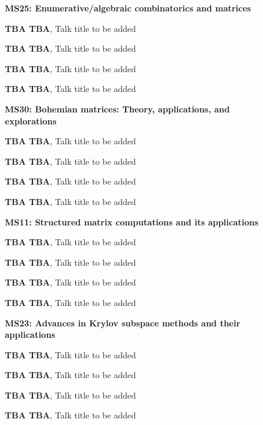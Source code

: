 \documentclass[ILAS2025-program.tex]{subfiles}
\begin{document}
\begin{description}
    \begin{description}
    \item[] \textbf{MS25: Enumerative/algebraic combinatorics and matrices} 
    \item[] \textbf{TBA TBA}, Talk title to be added
        \item[] \textbf{TBA TBA}, Talk title to be added
        \item[] \textbf{TBA TBA}, Talk title to be added
        \item[] \textbf{TBA TBA}, Talk title to be added
        \end{description}
    \begin{description}
    \item[] \textbf{MS30: Bohemian matrices: Theory, applications, and explorations} 
    \item[] \textbf{TBA TBA}, Talk title to be added
        \item[] \textbf{TBA TBA}, Talk title to be added
        \item[] \textbf{TBA TBA}, Talk title to be added
        \item[] \textbf{TBA TBA}, Talk title to be added
        \end{description}
    \begin{description}
    \item[] \textbf{MS11: Structured matrix computations and its applications} 
    \item[] \textbf{TBA TBA}, Talk title to be added
        \item[] \textbf{TBA TBA}, Talk title to be added
        \item[] \textbf{TBA TBA}, Talk title to be added
        \item[] \textbf{TBA TBA}, Talk title to be added
        \end{description}
    \begin{description}
    \item[] \textbf{MS23: Advances in Krylov subspace methods and their applications} 
    \item[] \textbf{TBA TBA}, Talk title to be added
        \item[] \textbf{TBA TBA}, Talk title to be added
        \item[] \textbf{TBA TBA}, Talk title to be added
        \item[] \textbf{TBA TBA}, Talk title to be added
        \end{description}
    \end{description}
    \newpage
\end{document}
